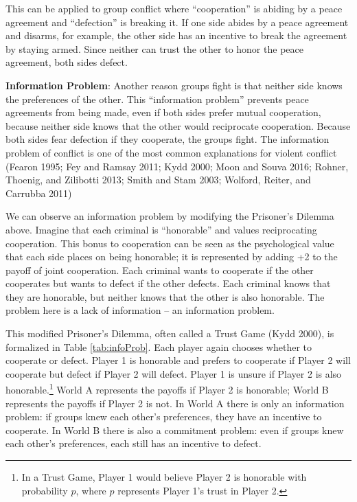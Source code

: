 \documentclass[11pt]{article}
\begin{document}
This can be applied to group conflict where ``cooperation'' is abiding
by a peace agreement and ``defection'' is breaking it. If one side
abides by a peace agreement and disarms, for example, the other side has
an incentive to break the agreement by staying armed. Since neither can
trust the other to honor the peace agreement, both sides defect.

\textbf{Information Problem}: Another reason groups fight is that
neither side knows the preferences of the other. This ``information
problem'' prevents peace agreements from being made, even if both sides
prefer mutual cooperation, because neither side knows that the other
would reciprocate cooperation. Because both sides fear defection if they
cooperate, the groups fight. The information problem of conflict is one
of the most common explanations for violent conflict (Fearon 1995; Fey
and Ramsay 2011; Kydd 2000; Moon and Souva 2016; Rohner, Thoenig, and
Zilibotti 2013; Smith and Stam 2003; Wolford, Reiter, and Carrubba 2011)

We can observe an information problem by modifying the Prisoner's
Dilemma above. Imagine that each criminal is ``honorable'' and values
reciprocating cooperation. This bonus to cooperation can be seen as the
psychological value that each side places on being honorable; it is
represented by adding +2 to the payoff of joint cooperation. Each
criminal wants to cooperate if the other cooperates but wants to defect
if the other defects. Each criminal knows that they are honorable, but
neither knows that the other is also honorable. The problem here is a
lack of information -- an information problem.

This modified Prisoner's Dilemma, often called a Trust Game (Kydd 2000),
is formalized in Table \ref{tab:infoProb}. Each player again chooses
whether to cooperate or defect. Player 1 is honorable and prefers to
cooperate if Player 2 will cooperate but defect if Player 2 will defect.
Player 1 is unsure if Player 2 is also honorable.\footnote{In a Trust
  Game, Player 1 would believe Player 2 is honorable with probability
  \(p\), where \(p\) represents Player 1's trust in Player 2.} World A
represents the payoffs if Player 2 is honorable; World B represents the
payoffs if Player 2 is not. In World A there is only an information
problem: if groups knew each other's preferences, they have an incentive
to cooperate. In World B there is also a commitment problem: even if
groups knew each other's preferences, each still has an incentive to
defect.
\end{document}
